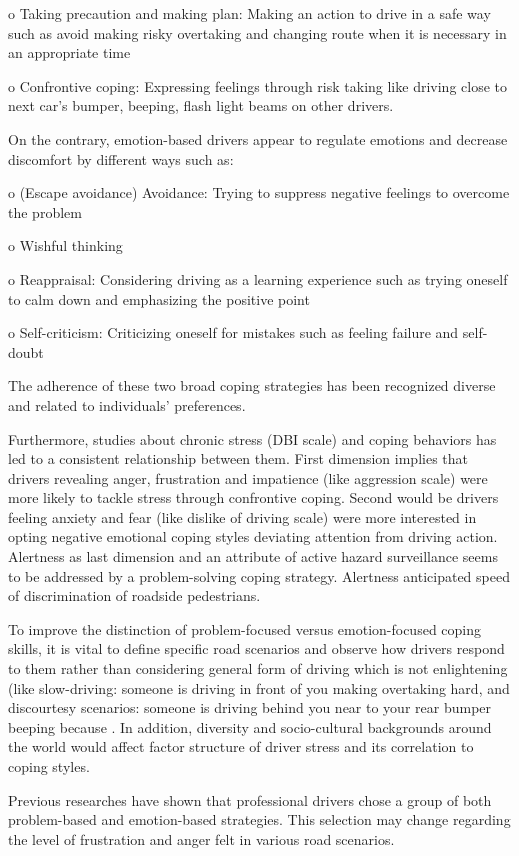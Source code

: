 \documentclass[
11pt, %
oneside, %
english, %
singlespacing, %
]{macthesis} %
\begin{document}
o Taking precaution and making plan: Making an action to drive in a safe way such as avoid making risky overtaking and changing route when it is necessary in an appropriate time

o Confrontive coping: Expressing feelings through risk taking like driving close to next car's bumper, beeping, flash light beams on other drivers.

On the contrary, emotion-based drivers appear to regulate emotions and decrease discomfort by different ways such as:

o (Escape avoidance) Avoidance: Trying to suppress negative feelings to overcome the problem

o Wishful thinking

o Reappraisal: Considering driving as a learning experience such as trying oneself to calm down and emphasizing the positive point

o Self-criticism: Criticizing oneself for mistakes such as feeling failure and self-doubt

The adherence of these two broad coping strategies has been recognized diverse and related to individuals' preferences.

Furthermore, studies about chronic stress (DBI scale) and coping behaviors has led to a consistent relationship between them. First dimension implies that drivers revealing anger, frustration and impatience (like aggression scale) were more likely to tackle stress through confrontive coping. Second would be drivers feeling anxiety and fear (like dislike of driving scale) were more interested in opting negative emotional coping styles deviating attention from driving action. Alertness as last dimension and an attribute of active hazard surveillance seems to be addressed by a problem-solving coping strategy. Alertness anticipated speed of discrimination of roadside pedestrians.

To improve the distinction of problem-focused versus emotion-focused coping skills, it is vital to define specific road scenarios and observe how drivers respond to them rather than considering general form of driving which is not enlightening (like slow-driving: someone is driving in front of you making overtaking hard, and discourtesy scenarios: someone is driving behind you near to your rear bumper beeping because . In addition, diversity and socio-cultural backgrounds around the world would affect factor structure of driver stress and its correlation to coping styles.

Previous researches have shown that professional drivers chose a group of both problem-based and emotion-based strategies. This selection may change regarding the level of frustration and anger felt in various road scenarios.
\end{document}
